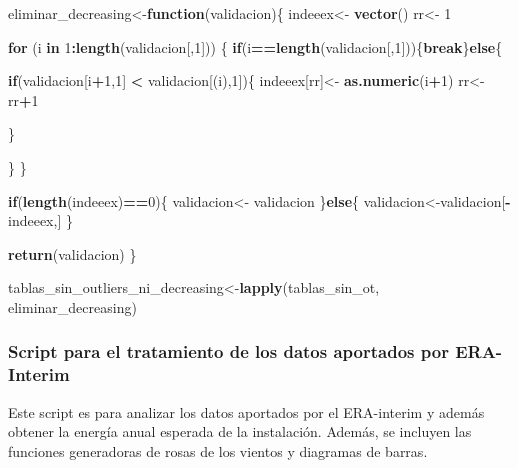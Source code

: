 \documentclass[]{article}
\newenvironment{Shaded}{\begin{snugshade}}{\end{snugshade}}
\newcommand{\KeywordTok}[1]{\textcolor[rgb]{0.13,0.29,0.53}{\textbf{#1}}}
\newcommand{\DecValTok}[1]{\textcolor[rgb]{0.00,0.00,0.81}{#1}}
\newcommand{\StringTok}[1]{\textcolor[rgb]{0.31,0.60,0.02}{#1}}
\newcommand{\ControlFlowTok}[1]{\textcolor[rgb]{0.13,0.29,0.53}{\textbf{#1}}}
\newcommand{\OperatorTok}[1]{\textcolor[rgb]{0.81,0.36,0.00}{\textbf{#1}}}
\newcommand{\NormalTok}[1]{#1}
\begin{document}
\begin{Shaded}
\begin{Highlighting}[]
\NormalTok{eliminar_decreasing<-}\ControlFlowTok{function}\NormalTok{(validacion)\{}
\NormalTok{  indeeex<-}\StringTok{ }\KeywordTok{vector}\NormalTok{()}
\NormalTok{  rr<-}\StringTok{ }\DecValTok{1} 
  
  \ControlFlowTok{for}\NormalTok{ (i }\ControlFlowTok{in} \DecValTok{1}\OperatorTok{:}\KeywordTok{length}\NormalTok{(validacion[,}\DecValTok{1}\NormalTok{])) \{}
    \ControlFlowTok{if}\NormalTok{(i}\OperatorTok{==}\KeywordTok{length}\NormalTok{(validacion[,}\DecValTok{1}\NormalTok{]))\{}\ControlFlowTok{break}\NormalTok{\}}\ControlFlowTok{else}\NormalTok{\{}
      
      \ControlFlowTok{if}\NormalTok{(validacion[i}\OperatorTok{+}\DecValTok{1}\NormalTok{,}\DecValTok{1}\NormalTok{] }\OperatorTok{<}\StringTok{ }\NormalTok{validacion[(i),}\DecValTok{1}\NormalTok{])\{}
\NormalTok{        indeeex[rr]<-}\StringTok{ }\KeywordTok{as.numeric}\NormalTok{(i}\OperatorTok{+}\DecValTok{1}\NormalTok{) }
\NormalTok{        rr<-rr}\OperatorTok{+}\DecValTok{1}
        
        
\NormalTok{      \}}
      
\NormalTok{    \}}
\NormalTok{  \}}
  
  \ControlFlowTok{if}\NormalTok{(}\KeywordTok{length}\NormalTok{(indeeex)}\OperatorTok{==}\DecValTok{0}\NormalTok{)\{}
\NormalTok{    validacion<-}\StringTok{ }\NormalTok{validacion}
\NormalTok{  \}}\ControlFlowTok{else}\NormalTok{\{}
\NormalTok{    validacion<-validacion[}\OperatorTok{-}\NormalTok{indeeex,]}
\NormalTok{  \}}
  
  \KeywordTok{return}\NormalTok{(validacion)}
\NormalTok{\}}

\NormalTok{tablas_sin_outliers_ni_decreasing<-}\KeywordTok{lapply}\NormalTok{(tablas_sin_ot, eliminar_decreasing)}
\end{Highlighting}
\end{Shaded}

\subsubsection{Script para el tratamiento de los datos aportados por
ERA-Interim}\label{script-para-el-tratamiento-de-los-datos-aportados-por-era-interim}

Este script es para analizar los datos aportados por el ERA-interim y
además obtener la energía anual esperada de la instalación. Además, se
incluyen las funciones generadoras de rosas de los vientos y diagramas
de barras.
\end{document}
